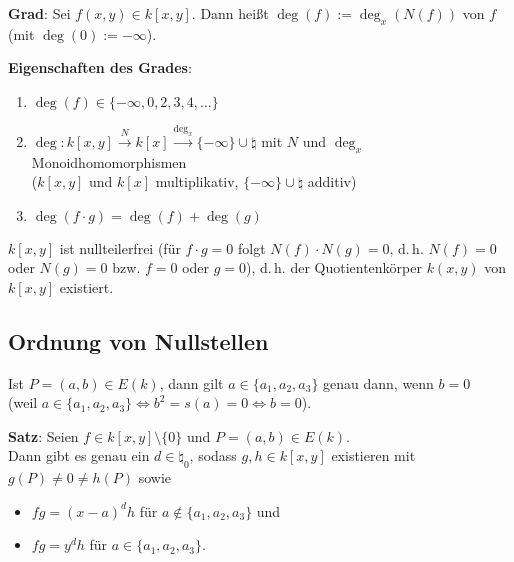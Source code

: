 \linie

\textbf{Grad}:
Sei $f(x, y) \in k[x, y]$.
Dann heißt $\deg(f) := \deg_x(N(f))$  von $f$
(mit $\deg(0) := -\infty$).

\textbf{Eigenschaften des Grades}:
\begin{enumerate}
    \item
    $\deg(f) \in \{-\infty, 0, 2, 3, 4, \dotsc\}$

    \item
    $\deg\colon k[x, y] \xrightarrow{N} k[x] \xrightarrow{\deg_x} \{-\infty\} \cup \natural$
    mit $N$ und $\deg_x$ Monoidhomomorphismen\\
    ($k[x, y]$ und $k[x]$ multiplikativ, $\{-\infty\} \cup \natural$ additiv)

    \item
    $\deg(f \cdot g) = \deg(f) + \deg(g)$
\end{enumerate}

$k[x, y]$ ist nullteilerfrei
(für $f \cdot g = 0$ folgt $N(f) \cdot N(g) = 0$, d.\,h. $N(f) = 0$ oder $N(g) = 0$ bzw.
$f = 0$ oder $g = 0$), d.\,h. der Quotientenkörper $k(x, y)$ von $k[x, y]$ existiert.

\pagebreak

\subsection{%
    Ordnung von Nullstellen%
}

Ist $P = (a, b) \in E(k)$, dann gilt $a \in \{a_1, a_2, a_3\}$ genau dann, wenn $b = 0$\\
(weil $a \in \{a_1, a_2, a_3\} \iff b^2 = s(a) = 0 \iff b = 0$).

\textbf{Satz}:
Seien $f \in k[x, y] \setminus \{0\}$ und $P = (a, b) \in E(k)$.\\
Dann gibt es genau ein $d \in \natural_0$, sodass $g, h \in k[x, y]$ existieren mit
$g(P) \not= 0 \not= h(P)$ sowie
\begin{itemize}
    \item
    $fg = (x - a)^d h$ für $a \notin \{a_1, a_2, a_3\}$ und

    \item
    $fg = y^d h$ für $a \in \{a_1, a_2, a_3\}$.
\end{itemize}

